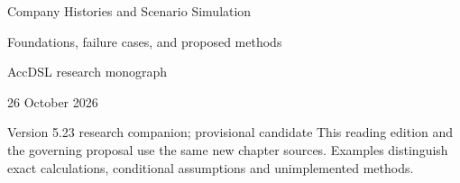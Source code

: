 \documentclass[11pt,a4paper]{report}
\begin{document}
\hypersetup{pageanchor=false}
\begin{titlepage}
{\Huge Company Histories and Scenario Simulation\par}
\vspace{12mm}
{\Large Foundations, failure cases, and proposed methods\par}
\vspace{8mm}
AccDSL research monograph\par 26 October 2026\par Version 5.23 research companion; provisional candidate
\vfill
This reading edition and the governing proposal use the same new chapter sources. Examples distinguish exact calculations, conditional assumptions and unimplemented methods.
\end{titlepage}
\hypersetup{pageanchor=true}
\tableofcontents
\clearpage{}


























\clearpage\label{sim:body-end}

\begingroup\raggedright
\endgroup
\end{document}
